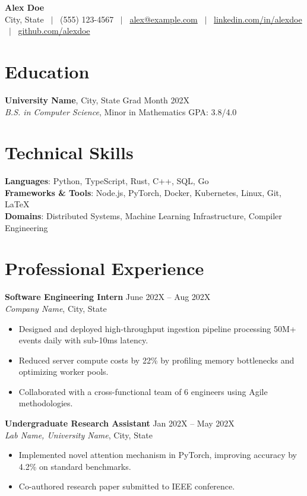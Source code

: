 \documentclass[10pt,letterpaper]{article}
\begin{document}
\begin{center}
{\LARGE\textbf{Alex Doe}}\\[3pt]
\small City, State \ $|$ \ (555) 123-4567 \ $|$ \ \href{mailto:alex@example.com}{alex@example.com} \ $|$ \ \href{https://linkedin.com}{linkedin.com/in/alexdoe} \ $|$ \ \href{https://github.com}{github.com/alexdoe}
\end{center}

\vspace{-6pt}

\section*{Education}
\textbf{University Name}, City, State \hfill Grad Month 202X\\
\textit{B.S. in Computer Science}, Minor in Mathematics \hfill GPA: 3.8/4.0

\section*{Technical Skills}
\textbf{Languages}: Python, TypeScript, Rust, C++, SQL, Go\\
\textbf{Frameworks \& Tools}: Node.js, PyTorch, Docker, Kubernetes, Linux, Git, LaTeX\\
\textbf{Domains}: Distributed Systems, Machine Learning Infrastructure, Compiler Engineering

\section*{Professional Experience}
\textbf{Software Engineering Intern} \hfill June 202X -- Aug 202X\\
\textit{Company Name}, City, State
\begin{itemize}
\item Designed and deployed high-throughput ingestion pipeline processing 50M+ events daily with sub-10ms latency.
\item Reduced server compute costs by 22\% by profiling memory bottlenecks and optimizing worker pools.
\item Collaborated with a cross-functional team of 6 engineers using Agile methodologies.
\end{itemize}

\textbf{Undergraduate Research Assistant} \hfill Jan 202X -- May 202X\\
\textit{Lab Name, University Name}, City, State
\begin{itemize}
\item Implemented novel attention mechanism in PyTorch, improving accuracy by 4.2\% on standard benchmarks.
\item Co-authored research paper submitted to IEEE conference.
\end{itemize}
\end{document}
